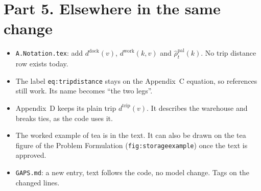 \documentclass[11pt,a4paper]{article}
\begin{document}
\section*{Part 5. Elsewhere in the same change}
\begin{itemize}[nosep]
  \item \texttt{A.Notation.tex}: add $d^{\mathrm{dock}}(v)$,
        $d^{\mathrm{work}}(k,v)$ and $\hat\rho^{\mathrm{pal}}_t(k)$. No trip
        distance row exists today.
  \item The label \texttt{eq:tripdistance} stays on the Appendix~C equation,
        so references still work. Its name becomes ``the two legs''.
  \item Appendix~D keeps its plain trip $d^{\mathrm{trip}}(v)$. It describes
        the warehouse and breaks ties, as the code uses it.
  \item The worked example of tea is in the text. It can also be drawn on
        the tea figure of the Problem Formulation (\texttt{fig:storageexample})
        once the text is approved.
  \item \texttt{GAPS.md}: a new entry, text follows the code, no model
        change. Tags on the changed lines.
\end{itemize}
\end{document}
